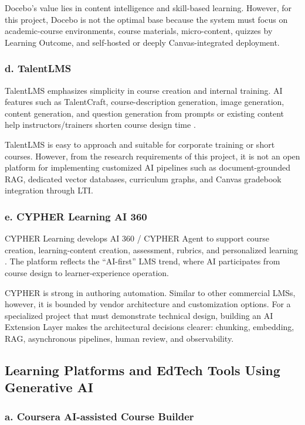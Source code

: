 Docebo's value lies in content intelligence and skill-based learning. However,
for this project, Docebo is not the optimal base because the system must focus
on academic-course environments, course materials, micro-content, quizzes by
Learning Outcome, and self-hosted or deeply Canvas-integrated deployment.

\subsubsection*{d. TalentLMS}

TalentLMS emphasizes simplicity in course creation and internal training.
AI features such as TalentCraft, course-description generation, image
generation, content generation, and question generation from prompts or
existing content help instructors/trainers shorten course design time
\cite{talentlms-ai}.

TalentLMS is easy to approach and suitable for corporate training or short
courses. However, from the research requirements of this project, it is not an
open platform for implementing customized AI pipelines such as
document-grounded RAG, dedicated vector databases, curriculum graphs, and Canvas
gradebook integration through LTI.

\subsubsection*{e. CYPHER Learning AI 360}

CYPHER Learning develops AI 360 / CYPHER Agent to support course creation,
learning-content creation, assessment, rubrics, and personalized learning
\cite{cypher-ai}. The platform reflects the ``AI-first'' LMS trend, where AI
participates from course design to learner-experience operation.

CYPHER is strong in authoring automation. Similar to other commercial LMSs,
however, it is bounded by vendor architecture and customization options. For a
specialized project that must demonstrate technical design, building an AI Extension Layer
makes the architectural decisions clearer: chunking, embedding, RAG,
asynchronous pipelines, human review, and observability.

\subsection{Learning Platforms and EdTech Tools Using Generative AI}

\subsubsection*{a. Coursera AI-assisted Course Builder}

